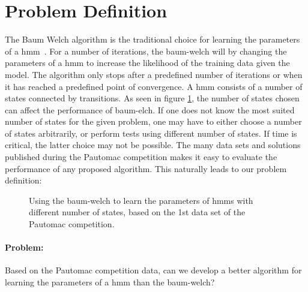 \section{Problem Definition}

The Baum Welch algorithm is the traditional choice for learning the parameters of a \gls{hmm}~\cite{pautomacTR}. 
For a number of iterations, the \gls{baum-welch} will by changing the parameters of a \gls{hmm} to increase the likelihood of the training data given the model. The algorithm only stops after a predefined number of iterations or when it has reached a predefined point of convergence.
A \gls{hmm} consists of a number of states connected by transitions. As seen in figure \ref{fig:bw-states-are-important}, the number of states chosen can affect the performance of \gls{baum-elch}. If one does not know the most suited number of states for the given problem, one may have to either choose a number of states arbitrarily, or perform tests using different number of states. If time is critical, the latter choice may not be possible.
The many data sets and solutions published during the Pautomac competition makes it easy to evaluate the performance of any proposed algorithm.
This naturally leads to our problem definition:

\begin{figure}
\begin{centering}
\caption{Using the \gls{baum-welch} to learn the parameters of \gls{hmm}s with different number of states, based on the 1st data set of the Pautomac competition.}
\label{fig:bw-states-are-important} 
\end{centering}
\end{figure}


\paragraph{Problem:}

Based on the Pautomac competition data, can we develop a better algorithm for learning the parameters of a \gls{hmm} than the \gls{baum-welch}?
